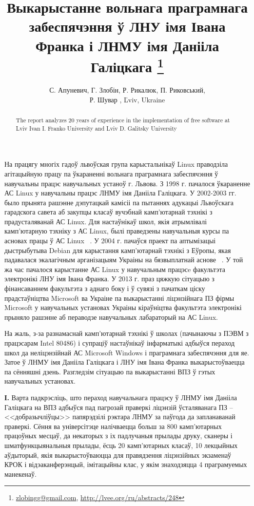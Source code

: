 \documentclass[10pt, a5paper]{article}
\begin{document}
\title{Выкарыстанне вольнага праграмнага забеспячэння ў ЛНУ імя Івана Франка і ЛНМУ імя Данііла Галіцкага \footnote{\url{zlobingg@gmail.com}, \url{http://lvee.org/ru/abstracts/248}}}
\author{С. Апуневич, Г. Злобін, Р. Рикалюк, П. Риковський, \\ Р. Шувар , Ľviv, Ukraine}
\maketitle
\begin{abstract}
The report analyzes 20 years of experience in the implementation of free software at Lviv Ivan I. Franko University and Lviv D. Galitsky University
\end{abstract}

На працягу многіх гадоў львоўская група карыстальнікаў Linux праводзіла агітацыйную працу па ўкараненні вольнага праграмнага забеспячэння ў навучальны працэс навучальных устаноў г. Львова. З 1998 г. пачалося ўкараненне АС Linux у навучальны працэс ЛНМУ імя Данііла Галіцкага. У 2002-2003 гг. было прынята рашэнне дэпутацкай камісіі па пытаннях адукацыі Львоўскага гарадскога савета аб закупцы класаў вучэбнай камп'ютарнай тэхнікі з прадусталяванай АС Linux. Для настаўнікаў школ, якія атрымлівалі камп'ютарную тэхніку з АС Linux, былі праведзены навучальныя курсы па асновах працы ў АС Linux ~\cite{Zlobin-1}. У 2004 г. пачаўся праект па аптымізацыі дыстрыбутыва Debian для карыстання камп'ютарнай тэхнікі з Еўропы, якая падавалася экалагічным арганізацыям Украіны на бязвыплатнай аснове ~\cite{Zlobin-2}. У той жа час пачалося карыстанне АС Linux у навучальным працэсe факультэта электронікі ЛНУ імя Івана Франка. У 2013 г. праз цяжкую сітуацыю з фінансаваннем факультэта з аднаго боку і ў сувязі з пачаткам ціску прадстаўніцтва Microsoft ва Украіне па выкарыстанні ліцэнзійнага ПЗ фірмы Microsoft у навучальных установах Украіны кіраўніцтва факультэта электронікі прыняло рашэнне аб пераводзе навучальных лабараторый на АС Linux.

На жаль, з-за разнамаснай камп'ютарнай тэхнікі ў школах (пачынаючы з ПЭВМ з працэсарам Intel 80486) і супраціў настаўнікаў інфарматыкі адбыўся пераход школ да неліцэнзійнай АС Microsoft Windows і праграмнага забеспячэння для яе. Затое ў ЛНМУ імя Данііла Галіцкага і ЛНУ імя Івана Франка выкарыстоўваецца па сённяшні дзень. Разгледзім сітуацыю па выкарыстанні ВПЗ ў гэтых навучальных установах.

\textbf{І.} Варта падкрэсліць, што пераход навучальнага працэсу ў ЛНМУ імя Данііла Галіцкага на ВПЗ адбыўся пад пагрозай праверкі ліцэнзій ўсталяванага ПЗ -- <<добразычліўцы>> папярэдзілі рэктара ЛНМУ за паўгода да запланаванай праверкі. Сёння ва універсітэце налічваецца больш за 800 камп'ютарных працоўных месцаў,  да некаторых з іх падлучаныя прылады друку, сканеры і шматфункцыянальныя прылады, ёсць 20 камп'ютарных класаў, 10 лекцыйных аўдыторый, якія выкарыстоўваюцца для правядзення ліцэнзійных экзаменаў КРОК і відэаканферэнцый, імітацыйны клас, у якім знаходзяцца 4 праграмуемых манекенаў.
\end{document}

